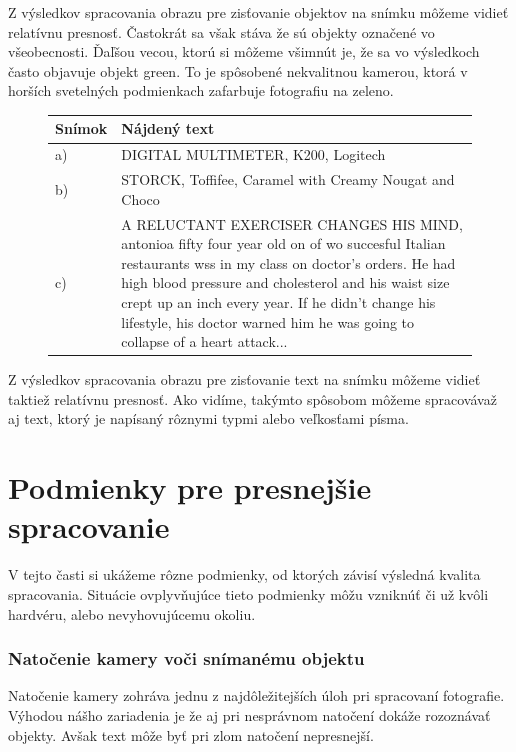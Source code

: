 \documentclass{template/socthesis}
\begin{document}
Z výsledkov spracovania obrazu pre zisťovanie objektov na snímku môžeme vidieť relatívnu presnosť. Častokrát sa však stáva že sú objekty označené vo všeobecnosti. Ďaľšou vecou, ktorú si môžeme všimnút je, že sa vo výsledkoch často objavuje objekt green. To je spôsobené nekvalitnou kamerou, ktorá v horších svetelných podmienkach zafarbuje fotografiu na zeleno.

\begin{figure}[H]	
	\begin{tabularx}{\textwidth}{|l|X| }
		\hline
		\textbf{Snímok} & \textbf{Nájdený text} \\
		\hline
		a) & DIGITAL MULTIMETER, K200, Logitech \\
		\hline
		b) & STORCK, Toffifee, Caramel with Creamy Nougat and Choco \\
		\hline
		c) & A RELUCTANT EXERCISER CHANGES HIS MIND, antonioa fifty four year old on of wo succesful Italian restaurants wss in my class on doctor's orders. He had high blood pressure and cholesterol and his waist size crept up an inch every year. If he didn't change his lifestyle, his doctor warned him he was going to collapse of a heart attack... \\
		\hline
	\end{tabularx}
\end{figure}

Z výsledkov spracovania obrazu pre zisťovanie text na snímku môžeme vidieť taktiež relatívnu presnosť. Ako vidíme, takýmto spôsobom môžeme spracovávaž aj text, ktorý je napísaný rôznymi typmi alebo veľkosťami písma.

\section*{Podmienky pre presnejšie spracovanie}
V tejto časti si ukážeme rôzne podmienky, od ktorých závisí výsledná kvalita spracovania. Situácie ovplyvňujúce tieto podmienky môžu vzniknúť či už kvôli hardvéru, alebo nevyhovujúcemu okoliu.

\subsubsection*{Natočenie kamery voči snímanému objektu}
Natočenie kamery zohráva jednu z najdôležitejších úloh pri spracovaní fotografie. Výhodou nášho zariadenia je že aj pri nesprávnom natočení dokáže rozoznávať objekty. Avšak text môže byť pri zlom natočení nepresnejší. 
\end{document}
